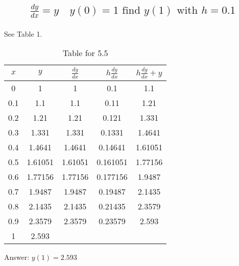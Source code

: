 \documentclass{article}
\begin{document}
\subsection{
	\begin{align*}
		\frac{dy}{dx} = y \quad y(0) = 1 \text{ find } y(1) \text{ with } h = 0.1
	\end{align*}
}
See Table 1. \\[10pt]
\begin{table}[h!]
\centering
\begin{tabular}{|c|c|c|c|c|}
\hline
$x$ & $y$ & $\frac{dy}{dx}$ & $h\frac{dy}{dx}$ & $h\frac{dy}{dx} + y$ \\ \hline
0 	& 1		 	& 1			& 0.1			& 1.1			\\ \hline
0.1 	& 1.1 		& 1.1			& 0.11		& 1.21		\\ \hline
0.2 	& 1.21	 	& 1.21		& 0.121		& 1.331		\\ \hline
0.3 	& 1.331 		& 1.331		& 0.1331		& 1.4641		\\ \hline
0.4 	& 1.4641		& 1.4641		& 0.14641		& 1.61051		\\ \hline
0.5 	& 1.61051		& 1.61051		& 0.161051	& 1.77156		\\ \hline
0.6 	& 1.77156		& 1.77156		& 0.177156	& 1.9487		\\ \hline
0.7 	& 1.9487		& 1.9487		& 0.19487		& 2.1435		\\ \hline
0.8 	& 2.1435		& 2.1435		& 0.21435		& 2.3579		\\ \hline
0.9 	& 2.3579		& 2.3579		& 0.23579		& 2.593		\\ \hline
1 	& 2.593
\end{tabular}
\caption{Table for 5.5}
\end{table}
Answer: $y(1) = 2.593$
\end{document}
